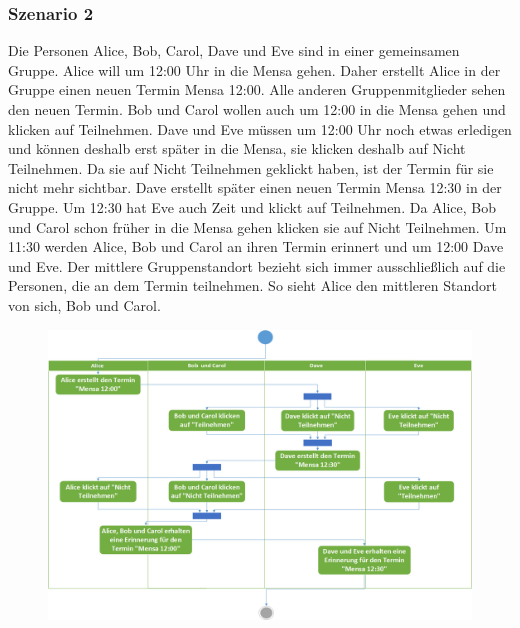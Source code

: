 \documentclass{scrartcl}
\begin{document}
	\newpage
	
	
	\subsubsection{Szenario 2}
	Die Personen Alice, Bob, Carol, Dave und Eve sind in einer gemeinsamen Gruppe.
	Alice will um 12:00 Uhr in die Mensa gehen. Daher erstellt Alice in der Gruppe einen neuen Termin \glqq{}Mensa 12:00\grqq{}.
	Alle anderen Gruppenmitglieder sehen den neuen Termin. Bob und Carol wollen auch um 12:00 in die Mensa gehen und klicken auf \glqq{}Teilnehmen\grqq{}.
	Dave und Eve müssen um 12:00 Uhr noch etwas erledigen und können deshalb erst später in die Mensa, sie klicken deshalb auf \glqq{}Nicht Teilnehmen\grqq{}.
	Da sie auf \glqq{}Nicht Teilnehmen\grqq{} geklickt haben, ist der Termin für sie nicht mehr sichtbar.
	Dave erstellt später einen neuen Termin \glqq{}Mensa 12:30\grqq{} in der Gruppe.
	Um 12:30 hat Eve auch Zeit und klickt auf \glqq{}Teilnehmen\grqq{}.
	Da Alice, Bob und Carol schon früher in die Mensa gehen klicken sie auf \glqq{}Nicht Teilnehmen\grqq{}.
	Um 11:30 werden Alice, Bob und Carol an ihren Termin erinnert und um 12:00 Dave und Eve.
	Der mittlere Gruppenstandort bezieht sich immer ausschließlich auf die Personen, die an dem Termin teilnehmen.
	So sieht Alice den mittleren Standort von sich, Bob und Carol.	
	\newline
	\newline
	\newline
	\begin{figure}[h]
		\includegraphics[width=\textwidth]{Szenario2}
	\end{figure}
	\newpage
	
\end{document}

